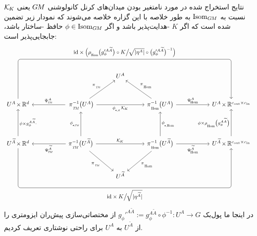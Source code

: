نتایج استخراج شده در مورد نامتغیر بودن میدان‌های کرنل کانولوشنی $G\mkern-1.4muM$ یعنی $\mathcal{K}_{\mkern-2mu K}$ نسبت به $\operatorname{Isom}_{G\mkern-1.4muM}$ به طور خلاصه با این گزاره خلاصه می‌شوند که نمودار زیر تضمین شده است که اگر $K$ -هدایت‌پذیر باشد و اگر $\phi \in \operatorname{Isom}_{G\mkern-1.4muM}$ حافظ -ساختار باشد، جابجایی‌پذیر است:
\begin{equation}
    \begin{tikzcd}[row sep=4.em, column sep=5.5em] %
        & &[-2.7em] U^A &[-2.7em] & \\[-1em]
        U^A \mkern-2mu\times\mkern-1mu \R^d
            \arrow[rrrr, rounded corners, to path={ 
                    -- ([yshift=15ex]\tikztostart.north) 
                    --node[above]{\small
                            $\id\times \pig( \rhoHom\big(g'^{A\widetilde{A}}_\phi\big) \circ K \big/\mkern-2mu \sqrt{|\eta^A|} \circ \big(g'^{A\widetilde{A}}_\phi\big)^{-1} \pig)$
                            } ([yshift=15ex]\tikztotarget.north) 
                    -- (\tikztotarget.north)
                    }]
        &
        \,\piTM^{-1}\big(U^A\big)
            \arrow[ru, "\piTM"]
            \arrow[rr, "\dphiK \KK"']
            \arrow[l, "\PsiTM^A"']
        & &
        \piHom^{-1}\big(U^A\big)
            \arrow[lu, "\piHom"']
            \arrow[r, "\PsiHom^A"]
        &
        U^A \mkern-2mu\times\mkern-1mu \R^{\cout\times\cin}
        \\
        U^{\widetilde{A}} \mkern-2mu\times\mkern-1mu \R^d
            \arrow[u, "\phi \times g_\phi^{A\widetilde{A}}\cdot"']
            \arrow[rrrr, rounded corners, to path={ 
                    -- ([yshift=-15ex]\tikztostart.south) 
                    --node[below]{\small$\id\times K \big/\mkern-2mu \sqrt{|\eta^{\widetilde{A}}|}$} ([yshift=-15ex]\tikztotarget.south) 
                    -- (\tikztotarget.south)
                    }]
        &
        \piTM^{-1}\big(U^{\widetilde{A}}\big)
            \arrow[rd, "\piTM"']
            \arrow[rr, "\KK"]
            \arrow[u, "\dphiTM"]
            \arrow[l, "\PsiTM^{\widetilde{A}}"]
        & &
        \piHom^{-1}\big(U^{\widetilde{A}}\big)
            \arrow[ld, "\piHom"]
            \arrow[u, "\dphiHom"']
            \arrow[r, "\PsiHom^{\widetilde{A}}"']
        &
        U^{\widetilde{A}} \mkern-2mu\times\mkern-1mu \R^{\cout\times\cin}
            \arrow[u, "\phi \times \rhoHom\big(g_\phi^{A\widetilde{A}}\big)"]
        \\[-1em]
        & & U^{\widetilde{A}}
        & &
    \end{tikzcd}
\end{equation}
در اینجا ما پول‌بک $g_\phi'^{A\widetilde{A}} := g_\phi^{A\widetilde{A}} \circ \phi^{-1} : U^A \to G$ از مختصاتی‌سازی پیش‌ران ایزومتری را از $U^{\widetilde{A}}$ به $U^A$ برای راحتی نوشتاری تعریف کردیم.


